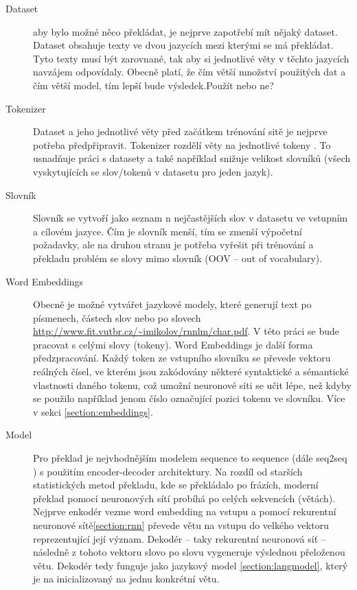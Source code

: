 \begin{description}
  \item[Dataset] aby bylo možné něco překládat, je nejprve zapotřebí mít nějaký dataset. Dataset obsahuje texty ve dvou jazycích mezi kterými se má překládat. Tyto texty musí být zarovnané, tak aby si jednotlivé věty v těchto jazycích navzájem odpovídaly. Obecně platí, že čím větší množství použitých dat a čím větší model, tím lepší bude výsledek.Použít nebo ne?\cite{googleLimits}

  \item[Tokenizer] Dataset a jeho jednotlivé věty před začátkem trénování sitě je nejprve potřeba předpřipravit. Tokenizer rozdělí věty na jednotlivé tokeny . To usnadňuje práci s datasety a také například snižuje velikost slovníků (všech vyskytujících se slov/tokenů v datasetu pro jeden jazyk).
  
  \item[Slovník] Slovník se vytvoří jako seznam n nejčastějších slov v datasetu ve vstupním a cílovém jazyce. Čím je slovník menší, tím se zmenší výpočetní požadavky, ale na druhou stranu je potřeba vyřešit při trénování a překladu problém se slovy mimo slovník (OOV -- out of vocabulary). 
  
  \item[Word Embeddings] Obecně je možné vytvářet jazykové modely, které generují text po písmenech, částech slov nebo po slovech \url{http://www.fit.vutbr.cz/~imikolov/rnnlm/char.pdf}. V této práci se bude pracovat s celými slovy (tokeny). Word Embeddings je další forma předzpracování. Každý token ze vstupního slovníku se převede vektoru reálných čísel, ve kterém jsou zakódovány některé syntaktické a sémantické vlastnosti daného tokenu, což umožní neuronové síti se učit lépe, než kdyby se použilo například jenom číslo označující pozici tokenu ve slovníku.  Více v sekci \ref{section:embeddings}.

  \item[Model] Pro překlad je nejvhodnějším modelem sequence to sequence (dále seq2seq \cite{seq2seq}) s použitím encoder-decoder architektury. Na rozdíl od starších statistických metod překladu, kde se překládalo po frázích, moderní překlad pomocí neuronových sítí probíhá po celých sekvencích (větách). Nejprve enkodér vezme word embedding na vstupu a pomocí rekurentní neuronové sítě\ref{section:rnn} převede větu na vstupu do velkého vektoru reprezentující její význam. Dekodér -- taky rekurentní neuronová síť -- následně z tohoto vektoru slovo po slovu vygeneruje výslednou přeloženou větu. Dekodér tedy funguje jako jazykový model \ref{section:langmodel}, který je na inicializovaný na jednu konkrétní větu.
\end{description}


